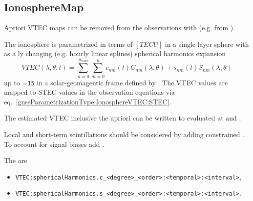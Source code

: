 \subsection{IonosphereMap}\label{gnssParametrizationType:ionosphereMap}
Apriori VTEC maps can be removed from the observations with
(e.g. from ).

The ionosphere is parametrized in terms of $[TECU]$ in a single layer sphere with
 as a ly
changing (e.g. hourly linear splines) spherical harmonics expansion
\begin{equation}
  VTEC(\lambda,\theta,t) = \sum_{n=0}^{n_{max}} \sum_{m=0}^n c_{nm}(t)C_{nm}(\lambda,\theta)+s_{nm}(t)S_{nm}(\lambda,\theta)
\end{equation}
up to =\verb|15| in a solar-geomagentic frame defined
by . The VTEC values are mapped to STEC values
in the observation equations via eq.~\eqref{gnssParametrizationType:IonosphereVTEC:STEC}.

The estimated VTEC inclusive the apriori 
can be written to 
evaluated at  and .

Local and short-term scintillations should be considered by adding constrained
.
To account for signal biases add
.

The  are
\begin{itemize}
\item \verb|VTEC:sphericalHarmonics.c_<degree>_<order>:<temporal>:<interval>|,
\item \verb|VTEC:sphericalHarmonics.s_<degree>_<order>:<temporal>:<interval>|.
\end{itemize}


